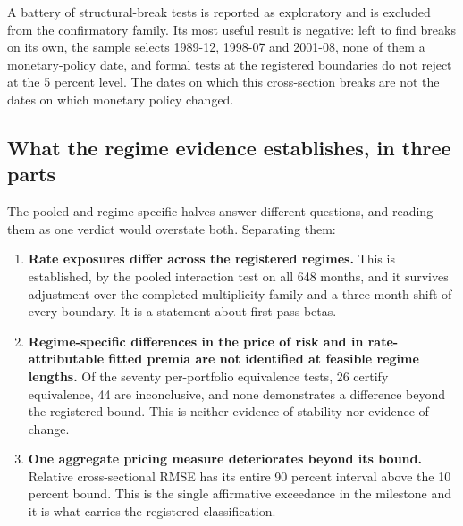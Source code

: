 \documentclass[11pt]{article}
\begin{document}
A battery of structural-break tests is reported as exploratory and is excluded
from the confirmatory family. Its most useful result is negative: left to find
breaks on its own, the sample selects 1989-12, 1998-07 and 2001-08, none of them %
a monetary-policy date, and formal tests at the registered boundaries do not
reject at the 5 percent level. The dates on which this cross-section breaks are %
not the dates on which monetary policy changed. %

\subsection{What the regime evidence establishes, in three parts}

The pooled and regime-specific halves answer different questions, and reading
them as one verdict would overstate both. Separating them:

\begin{enumerate}
\item \textbf{Rate exposures differ across the registered regimes.} This is
established, by the pooled interaction test on all 648 months, and it survives %
adjustment over the completed multiplicity family and a three-month shift of
every boundary. It is a statement about first-pass betas.
\item \textbf{Regime-specific differences in the price of risk and in
rate-attributable fitted premia are not identified at feasible regime lengths.}
Of the seventy per-portfolio equivalence tests, 26 certify equivalence, 44 are %
inconclusive, and none demonstrates a difference beyond the registered bound. %
This is neither evidence of stability nor evidence of change.
\item \textbf{One aggregate pricing measure deteriorates beyond its bound.}
Relative cross-sectional RMSE has its entire 90 percent interval above the 10 %
percent bound. This is the single affirmative exceedance in the milestone and it
is what carries the registered classification. %
\end{enumerate}
\end{document}
